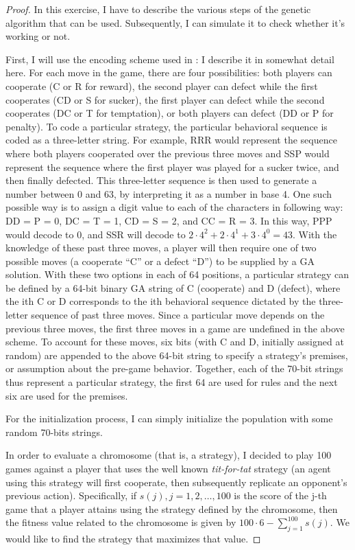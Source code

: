 \begin{proof}
    In this exercise, I have to describe the various steps of the genetic algorithm that can be used. Subsequently, I can simulate it to check whether it's working or not.\par
    First, I will use the encoding scheme used in \cite{axelrod}: I describe it in somewhat detail here. For each move in the game, there are four possibilities: both players can cooperate (C or R for reward), the second player can defect while the first cooperates (CD or S for sucker), the first player can defect while the second cooperates (DC or T for temptation), or both players can defect (DD or P for penalty). To code a particular strategy, the particular behavioral sequence is coded as a three-letter string. For example, RRR would represent the sequence where both players cooperated over the previous three moves and SSP would represent the sequence where the first player was played for a sucker twice, and then finally defected. This three-letter sequence is then used to generate a number between 0 and 63, by interpreting it as a number in base 4. One such possible way is to assign
    a digit value to each of the characters in following way: DD = P = 0, DC = T = 1, CD = S = 2, and CC = R = 3. In this way, PPP would decode to 0, and SSR will decode to \(2\cdot4^2 + 2 \cdot 4^1 + 3 \cdot 4^0 = 43\). With the knowledge of these past three moves, a player will then require one of two possible moves (a cooperate “C” or a defect “D”) to be supplied by a GA solution. With these two options in each of 64 positions, a particular strategy can be defined by a 64-bit binary GA string of C (cooperate) and D (defect), where the ith C or D corresponds to the ith behavioral sequence dictated by the three-letter sequence of past three moves. Since a particular move depends on the previous three moves, the first three moves in a game are undefined in the above scheme. To account for these moves, six bits (with C and D, initially assigned at random) are appended to the above 64-bit string to specify a strategy’s premises, or assumption about the pre-game behavior. Together, each of the 70-bit strings thus represent a particular strategy, the first 64 are used for rules and the next six are used for the premises.\par
    For the initialization process, I can simply initialize the population with some random 70-bits strings.\par
    In order to evaluate a chromosome (that is, a strategy), I decided to play 100 games against a player that uses the well known \emph{tit-for-tat} strategy (an agent using this strategy will first cooperate, then subsequently replicate an opponent's previous action). Specifically, if \(s(j), j=1,2,\dots,100\) is the score of the j-th game that a player attains using the strategy defined by the chromosome, then the fitness value related to the chromosome is given by \(100\cdot 6 - \sum_{j=1}^{100}s(j)\). We would like to find the strategy that maximizes that value.\par

\end{proof}
